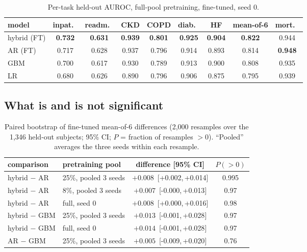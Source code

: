 \documentclass[10pt,letterpaper]{article}
\newcommand{\ci}[2]{\,[{#1},\,{#2}]}
\begin{document}
\begin{table}[t]
\centering\small
\caption{Per-task held-out AUROC, full-pool pretraining, fine-tuned, seed 0.}
\label{tab:pertask}
\setlength{\tabcolsep}{4pt}
\begin{tabular}{lcccccccc}
\toprule
model & inpat.\ & readm.\ & CKD & COPD & diab.\ & HF & mean-of-6 & mort.\ \\
\midrule
hybrid (FT) & \textbf{0.732} & \textbf{0.631} & \textbf{0.939} & \textbf{0.801} & \textbf{0.925} & \textbf{0.904} & \textbf{0.822} & 0.944 \\
AR (FT)     & 0.717 & 0.628 & 0.937 & 0.796 & 0.914 & 0.893 & 0.814 & \textbf{0.948} \\
GBM         & 0.700 & 0.617 & 0.930 & 0.789 & 0.913 & 0.900 & 0.808 & 0.935 \\
LR          & 0.680 & 0.626 & 0.890 & 0.796 & 0.906 & 0.875 & 0.795 & 0.939 \\
\bottomrule
\end{tabular}
\end{table}

\subsection{What is and is not significant}

\begin{table}[t]
\centering\small
\caption{Paired bootstrap of fine-tuned mean-of-6 differences (2{,}000
resamples over the 1{,}346 held-out subjects; 95\% CI; $P$ = fraction of
resamples $>0$). ``Pooled'' averages the three seeds within each resample.}
\label{tab:boot}
\begin{tabular}{llcc}
\toprule
comparison & pretraining pool & difference [95\% CI] & $P(>0)$ \\
\midrule
hybrid $-$ AR  & 25\%, pooled 3 seeds & $+0.008$ \ci{+0.002}{+0.014} & 0.995 \\
hybrid $-$ AR  & 8\%, pooled 3 seeds  & $+0.007$ \ci{-0.000}{+0.013} & 0.97 \\
hybrid $-$ AR  & full, seed 0         & $+0.008$ \ci{+0.000}{+0.016} & 0.98 \\
\addlinespace
hybrid $-$ GBM & 25\%, pooled 3 seeds & $+0.013$ \ci{-0.001}{+0.028} & 0.97 \\
hybrid $-$ GBM & full, seed 0         & $+0.014$ \ci{-0.001}{+0.028} & 0.97 \\
AR $-$ GBM     & 25\%, pooled 3 seeds & $+0.005$ \ci{-0.009}{+0.020} & 0.76 \\
\bottomrule
\end{tabular}
\end{table}
\end{document}
